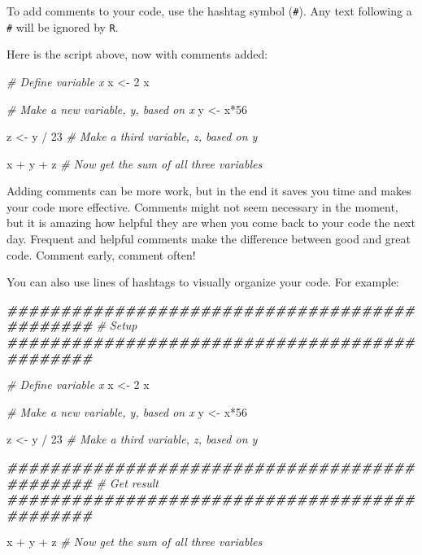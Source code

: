\documentclass[
]{book}
\newenvironment{Shaded}{\begin{snugshade}}{\end{snugshade}}
\newcommand{\CommentTok}[1]{\textcolor[rgb]{0.56,0.35,0.01}{\textit{#1}}}
\newcommand{\DecValTok}[1]{\textcolor[rgb]{0.00,0.00,0.81}{#1}}
\newcommand{\DocumentationTok}[1]{\textcolor[rgb]{0.56,0.35,0.01}{\textbf{\textit{#1}}}}
\newcommand{\NormalTok}[1]{#1}
\newcommand{\OtherTok}[1]{\textcolor[rgb]{0.56,0.35,0.01}{#1}}
\newcommand{\SpecialCharTok}[1]{\textcolor[rgb]{0.00,0.00,0.00}{#1}}
\begin{document}
To add comments to your code, use the hashtag symbol (\texttt{\#}). Any text following a \texttt{\#} will be ignored by \texttt{R}.

Here is the script above, now with comments added:

\begin{Shaded}
\begin{Highlighting}[]
\CommentTok{\# Define variable x}
\NormalTok{x }\OtherTok{\textless{}{-}} \DecValTok{2} 
\NormalTok{x}

\CommentTok{\# Make a new variable, y, based on x}
\NormalTok{y }\OtherTok{\textless{}{-}}\NormalTok{ x}\SpecialCharTok{*}\DecValTok{56}

\NormalTok{z }\OtherTok{\textless{}{-}}\NormalTok{ y }\SpecialCharTok{/} \DecValTok{23} \CommentTok{\# Make a third variable, z, based on y}
 
\NormalTok{x }\SpecialCharTok{+}\NormalTok{ y }\SpecialCharTok{+}\NormalTok{ z }\CommentTok{\# Now get the sum of all three variables}
\end{Highlighting}
\end{Shaded}

Adding comments can be more work, but in the end it saves you time and makes your code more effective. Comments might not seem necessary in the moment, but it is amazing how helpful they are when you come back to your code the next day. Frequent and helpful comments make the difference between good and great code. Comment early, comment often!

You can also use lines of hashtags to visually organize your code. For example:

\begin{Shaded}
\begin{Highlighting}[]
\DocumentationTok{\#\#\#\#\#\#\#\#\#\#\#\#\#\#\#\#\#\#\#\#\#\#\#\#\#\#\#\#\#\#\#\#\#\#\#\#\#\#\#\#\#\#\#\#\#\#}
\CommentTok{\# Setup}
\DocumentationTok{\#\#\#\#\#\#\#\#\#\#\#\#\#\#\#\#\#\#\#\#\#\#\#\#\#\#\#\#\#\#\#\#\#\#\#\#\#\#\#\#\#\#\#\#\#\#}

\CommentTok{\# Define variable x}
\NormalTok{x }\OtherTok{\textless{}{-}} \DecValTok{2} 
\NormalTok{x}

\CommentTok{\# Make a new variable, y, based on x}
\NormalTok{y }\OtherTok{\textless{}{-}}\NormalTok{ x}\SpecialCharTok{*}\DecValTok{56}

\NormalTok{z }\OtherTok{\textless{}{-}}\NormalTok{ y }\SpecialCharTok{/} \DecValTok{23} \CommentTok{\# Make a third variable, z, based on y}
 

\DocumentationTok{\#\#\#\#\#\#\#\#\#\#\#\#\#\#\#\#\#\#\#\#\#\#\#\#\#\#\#\#\#\#\#\#\#\#\#\#\#\#\#\#\#\#\#\#\#\#}
\CommentTok{\# Get result}
\DocumentationTok{\#\#\#\#\#\#\#\#\#\#\#\#\#\#\#\#\#\#\#\#\#\#\#\#\#\#\#\#\#\#\#\#\#\#\#\#\#\#\#\#\#\#\#\#\#\#}

\NormalTok{x }\SpecialCharTok{+}\NormalTok{ y }\SpecialCharTok{+}\NormalTok{ z }\CommentTok{\# Now get the sum of all three variables}
\end{Highlighting}
\end{Shaded}
\end{document}
